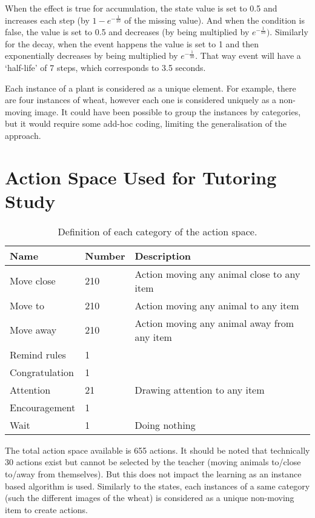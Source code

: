 When the effect is true for accumulation, the state value is set to 0.5 and increases each step (by $1-e^{-\frac{1}{10}}$ of the missing value). And when the condition is false, the value is set to 0.5 and decreases (by being multiplied by $e^{-\frac{1}{10}})$. Similarly for the decay, when the event happens the value is set to 1 and then exponentially decreases by being multiplied by $e^{-\frac{1}{10}}$. That way event will have a `half-life' of 7 steps, which corresponds to 3.5 seconds.

Each instance of a plant is considered as a unique element. For example, there are four instances of wheat, however each one is considered uniquely as a non-moving image. It could have been possible to group the instances by categories, but it would require some add-hoc coding, limiting the generalisation of the approach.

\cleartooddpage
\chapter{Action Space Used for Tutoring Study} \label{ann:action}
\begin{table}[ht]
	\centering
	\caption{Definition of each category of the action space.}
	\label{tab:tutoring_policies}
	\begin{tabularx}{\textwidth}{@{}llX@{}}\toprule
		Name & Number & Description \\
		\midrule
			Move close & 210 &  Action moving any animal close to any item\\
			Move to & 210 & Action moving any animal to any item\\
			Move away & 210 & Action moving any animal away from any item\\
			Remind rules & 1 & \\
			Congratulation & 1 & \\
			Attention & 21 & Drawing attention to any item\\
			Encouragement & 1 & \\
			Wait & 1 & Doing nothing\\
		\bottomrule
	\end{tabularx}
\end{table}

The total action space available is 655 actions. It should be noted that technically 30 actions exist but cannot be selected by the teacher (moving animals to/close to/away from themselves). But this does not impact the learning as an instance based algorithm is used. Similarly to the states, each instances of a same category (such the different images of the wheat) is considered as a unique non-moving item to create actions.